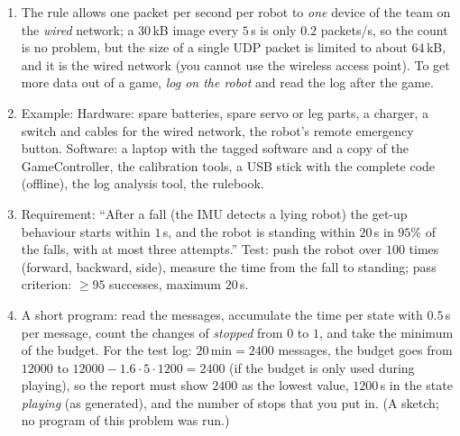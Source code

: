 \begin{enumerate}[label=\textbf{\ansnum.\arabic*}]
  \item The rule allows one packet per second per robot to \emph{one} device of the team on the \emph{wired} network; a $30$\,kB image every $5$\,s is only $0.2$ packets/s, so the count is no problem, but the size of a single UDP packet is limited to about $64$\,kB, and it is the wired network (you cannot use the wireless access point). To get more data out of a game, \emph{log on the robot} and read the log after the game.
  \item Example: Hardware: spare batteries, spare servo or leg parts, a charger, a switch and cables for the wired network, the robot's remote emergency button. Software: a laptop with the tagged software and a copy of the GameController, the calibration tools, a USB stick with the complete code (offline), the log analysis tool, the rulebook.
  \item Requirement: ``After a fall (the IMU detects a lying robot) the get-up behaviour starts within $1$\,s, and the robot is standing within $20$\,s in $95\%$ of the falls, with at most three attempts.'' Test: push the robot over $100$ times (forward, backward, side), measure the time from the fall to standing; pass criterion: $\ge95$ successes, maximum $20$\,s.
  \item A short program: read the messages, accumulate the time per state with $0.5$\,s per message, count the changes of \emph{stopped} from $0$ to $1$, and take the minimum of the budget. For the test log: $20\,\text{min}=2400$ messages, the budget goes from $12000$ to $12000-1.6\cdot5\cdot1200=2400$ (if the budget is only used during playing), so the report must show $2400$ as the lowest value, $1200$\,s in the state \emph{playing} (as generated), and the number of stops that you put in. (A sketch; no program of this problem was run.)
\end{enumerate}
